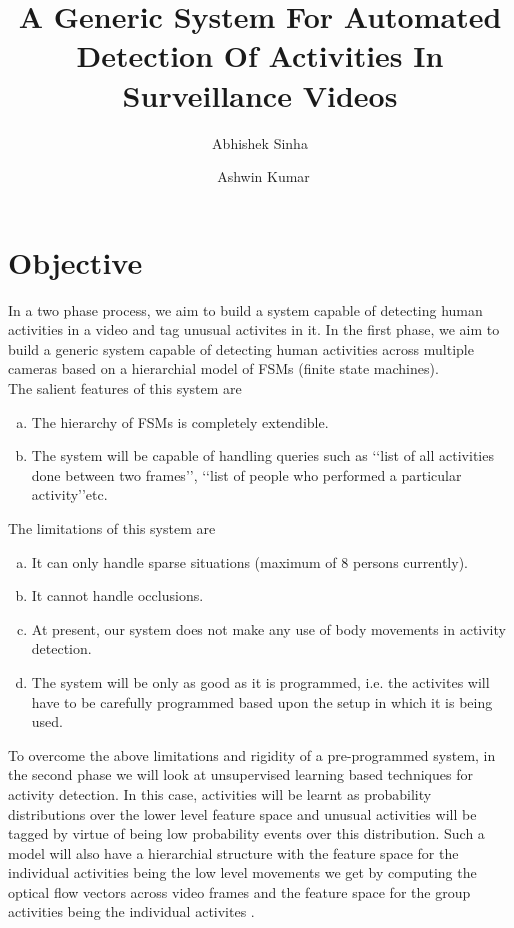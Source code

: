 \documentclass[a4paper]{article}
\begin{document}
\title{A Generic System For Automated Detection Of Activities In Surveillance Videos}
\author{Abhishek Sinha \and\ Ashwin Kumar}
\maketitle
\section{Objective}
In a two phase process, we aim to build a system capable of detecting human activities in a video and tag unusual activites in it. In the 
first phase, we aim to build a generic system capable of detecting human activities across multiple cameras based on a hierarchial model 
of FSMs (finite state machines).\\
The salient features of this system are
\begin{enumerate}[(a)]
\item The hierarchy of FSMs is completely extendible.
\item The system will be capable of handling queries such as \lq\lq list of all activities done between two frames\rq\rq, \lq\lq list of 
people who performed a particular activity\rq\rq etc.
\end{enumerate}
The limitations of this system are
\begin{enumerate}[(a)]
\item It can only handle sparse situations (maximum of 8 persons currently).
\item It cannot handle occlusions.
\item At present, our system does not make any use of body movements in activity detection.
\item The system will be only as good as it is programmed, i.e. the activites will have to be carefully programmed based upon the setup in 
which it is being used.
\end{enumerate}	
	
To overcome the above limitations and rigidity of a pre-programmed system, in the second phase we will look at unsupervised learning based 
techniques for activity detection. In this case, activities will be learnt as probability distributions over the lower level feature space 
and unusual activities will be tagged by virtue of being low probability events over this distribution. Such a model will also have a 
hierarchial structure with the feature space for the individual activities being the low level movements we get by computing the optical 
flow vectors across video frames and the feature space for the group activities being the individual activites \cite{tanveer}.
\end{document}
